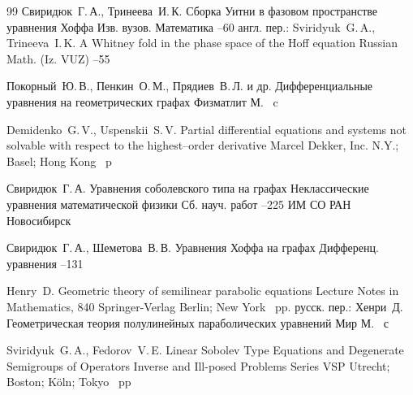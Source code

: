 \begin{thebibliography}{99}
\by Свиридюк~Г.\,А., Тринеева~И.\,К.
\paper Сборка Уитни в фазовом пространстве уравнения Хоффа
\jour Изв. вузов. Математика
--60
\transl
англ. пер.:
\by Sviridyuk~G.\,A., Trineeva~I.\,K.
\paper A Whitney fold in the phase space of the Hoff equation
\jour Russian Math. (Iz. VUZ)
--55

\by Покорный~Ю.\,В., Пенкин~О.\,М., Прядиев~В.\,Л. и др.
\book Дифференциальные уравнения на геометрических графах
\publ Физматлит
\publaddr М.
~c

\by Demidenko~G.\,V., Uspenskii~S.\,V.
\book Partial differential equations and systems not solvable with respect to the highest--order derivative
\publ Marcel Dekker, Inc.
\publaddr N.Y.; Basel; Hong Kong
~p

\by Свиридюк~Г.\,А.
\paper Уравнения соболевского типа на графах
\inbook Неклассические уравнения математической физики
\bookinfo Сб. науч. работ
--225
\publ ИМ СО РАН
\publaddr Новосибирск

\by Свиридюк~Г.\,А.,  Шеметова~В.\,В.
\paper Уравнения Хоффа на графах
\jour Дифференц. уравнения
--131

\by Henry~D.
\paper Geometric theory of semilinear parabolic equations
\serial Lecture Notes in Mathematics, 840
\publ Springer-Verlag
\publaddr Berlin; New York
~pp.
\rtransl
русск. пер.:
\by Хенри~Д.
\book Геометрическая теория полулинейных параболических уравнений
\publ Мир
\publaddr М.
~с


\by Sviridyuk~G.\,A., Fedorov~V.\,E.
\paper Linear Sobolev Type Equations and Degenerate Semigroups of Operators
\serial Inverse and Ill-posed Problems Series
\publ VSP
\publaddr Utrecht; Boston; K\"oln; Tokyo
~pp


\end{thebibliography}

